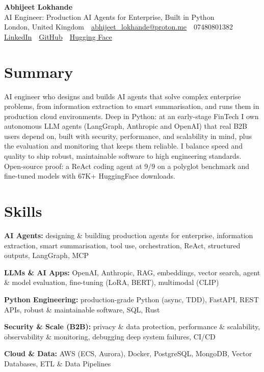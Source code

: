 \documentclass[10pt,a4paper]{article}
\newcommand{\sep}{\,\textcolor{accent!60}{\textbar}\,}
\begin{document}
\begin{center}
  {\fontsize{24}{26}\selectfont\bfseries Abhijeet Lokhande}\\[3pt]
  {\color{accent}\large AI Engineer: Production AI Agents for Enterprise, Built in Python}\\[5pt]
  {\small
    London, United Kingdom \sep
    \href{mailto:abhijeet_lokhande@proton.me}{abhijeet\_lokhande@proton.me} \sep
    07480801382 \\[2pt]
    \href{https://www.linkedin.com/in/ablds/}{LinkedIn} \sep
    \href{https://github.com/abhijeetscode}{GitHub} \sep
    \href{https://huggingface.co/ab-ai}{Hugging Face}
  }
\end{center}
\vspace{2pt}

\section{Summary}
AI engineer who designs and builds AI agents that solve complex enterprise problems, from information extraction to smart summarisation, and runs them in production cloud environments. Deep in Python: at an early-stage FinTech I own autonomous LLM agents (LangGraph, Anthropic and OpenAI) that real B2B users depend on, built with security, performance, and scalability in mind, plus the evaluation and monitoring that keeps them reliable. I balance speed and quality to ship robust, maintainable software to high engineering standards. Open-source proof: a ReAct coding agent at 9/9 on a polyglot benchmark and fine-tuned models with 67K+ HuggingFace downloads.

\section{Skills}
\begin{tight}
  \item[\textcolor{accent}{\small$\bullet$}] \textbf{AI Agents:} designing \& building production agents for enterprise, information extraction, smart summarisation, tool use, orchestration, ReAct, structured outputs, LangGraph, MCP
  \item[\textcolor{accent}{\small$\bullet$}] \textbf{LLMs \& AI Apps:} OpenAI, Anthropic, RAG, embeddings, vector search, agent \& model evaluation, fine-tuning (LoRA, BERT), multimodal (CLIP)
  \item[\textcolor{accent}{\small$\bullet$}] \textbf{Python Engineering:} production-grade Python (async, TDD), FastAPI, REST APIs, robust \& maintainable software, SQL, Rust
  \item[\textcolor{accent}{\small$\bullet$}] \textbf{Security \& Scale (B2B):} privacy \& data protection, performance \& scalability, observability \& monitoring, debugging deep system failures, CI/CD
  \item[\textcolor{accent}{\small$\bullet$}] \textbf{Cloud \& Data:} AWS (ECS, Aurora), Docker, PostgreSQL, MongoDB, Vector Databases, ETL \& Data Pipelines
\end{tight}
\end{document}
